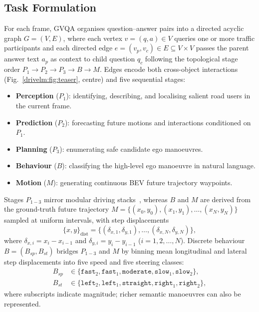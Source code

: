 \subsection{Task Formulation}\label{drivelm:sec:task}

For each frame, GVQA organises question--answer pairs into a directed acyclic graph $G=(V,E)$, where each vertex $v=(q,a)\in V$ queries one or more traffic participants and each directed edge $e=(v_p,v_c)\in E\subseteq V\times V$ passes the parent answer text $a_p$ as context to child question $q_c$ following the topological stage order $P_1 \to P_2 \to P_3 \to B \to M$. Edges encode both cross-object interactions (Fig.~\ref{drivelm:fig:teaser}, centre) and five sequential stages:
\begin{itemize}
  \item \textbf{Perception} ($P_1$): identifying, describing, and localising salient road users in the current frame.
  \item \textbf{Prediction} ($P_2$): forecasting future motions and interactions conditioned on $P_1$.
  \item \textbf{Planning} ($P_3$): enumerating safe candidate ego manoeuvres.
  \item \textbf{Behaviour} ($B$): classifying the high-level ego manoeuvre in natural language.
  \item \textbf{Motion} ($M$): generating continuous BEV future trajectory waypoints.
\end{itemize}

Stages $P_{1-3}$ mirror modular driving stacks~\cite{chen2024e2esurvey}, whereas $B$ and $M$ are derived from the ground-truth future trajectory $M=\{(x_0,y_0),(x_1,y_1),\ldots,(x_N,y_N)\}$ sampled at uniform intervals, with step displacements
\begin{equation}
  \{x,y\}_{\text{dist}} = \{(\delta_{x,1},\delta_{y,1}),\ldots,(\delta_{x,N},\delta_{y,N})\},
  \label{drivelm:eq:xy_dist}
\end{equation}
where $\delta_{x,i}=x_i-x_{i-1}$ and $\delta_{y,i}=y_i-y_{i-1}$ ($i=1,2,\ldots,N$). Discrete behaviour $B=(B_{sp},B_{st})$ bridges $P_{1-3}$ and $M$ by binning mean longitudinal and lateral step displacements into five speed and five steering classes:
\begin{align*}
  B_{sp} &\in \{\texttt{fast}_2, \texttt{fast}_1, \texttt{moderate}, \texttt{slow}_1, \texttt{slow}_2\},\\
  B_{st} &\in \{\texttt{left}_2, \texttt{left}_1, \texttt{straight}, \texttt{right}_1, \texttt{right}_2\},
\end{align*}
where subscripts indicate magnitude; richer semantic manoeuvres can also be represented.

